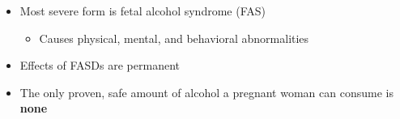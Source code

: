 \documentclass[12pt]{article}
\begin{document}
\begin{itemize}
\begin{itemize}
\begin{itemize}
                                \item Most severe form is fetal alcohol syndrome (FAS)
                                    \begin{itemize}
                                        \item Causes physical, mental, and behavioral abnormalities
                                    \end{itemize}
                                \item Effects of FASDs are permanent
                                \item The only proven, safe amount of alcohol a pregnant woman can consume is \textbf{none}
                            \end{itemize}
                    \end{itemize}
            \end{itemize}
\end{document}
